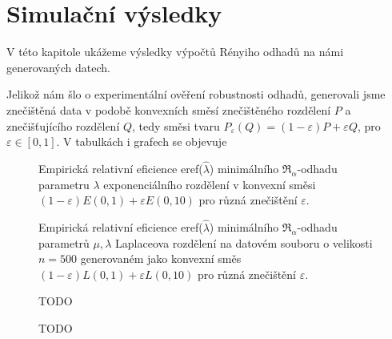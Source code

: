 \chapter{Simulační výsledky}

\noindent V této kapitole ukážeme výsledky výpočtů Rényiho odhadů na námi generovaných datech. 

Jelikož nám šlo o experimentální ověření robustnosti odhadů, generovali jsme znečištěná data v podobě konvexních směsí znečištěného rozdělení $P$ a znečišťujícího rozdělení $Q$, tedy směsi tvaru $P_\varepsilon(Q) = (1-\varepsilon)P + \varepsilon Q$, pro $\varepsilon \in [0,1]$. V tabulkách i grafech se objevuje 



\begin{figure}[htb]
	\begin{center}
		\caption{Empirická relativní eficience eref($\hat{\lambda}$) minimálního $\mathfrak{R}_\alpha$-odhadu parametru $\lambda$ exponenciálního rozdělení v konvexní směsi 
		$(1-\varepsilon)E(0,1) + \varepsilon E(0,10)$ pro různá znečištění $\varepsilon$.}
		\label{fig-eref-Exp-lambda}
	\end{center}
\end{figure}

\begin{figure}[htb]
	\begin{center}
		\caption{Empirická relativní eficience eref($\hat{\lambda}$) minimálního $\mathfrak{R}_\alpha$-odhadu parametrů  $\mu,\lambda$ Laplaceova rozdělení na datovém souboru o velikosti $n = 500$ generovaném	jako konvexní směs	$(1-\varepsilon)L(0,1) + \varepsilon L(0,10)$ pro různá znečištění $\varepsilon$.}
		\label{fig-eref-Laplace-lambda}
	\end{center}
\end{figure}

\begin{figure}[htb]
	\begin{center}
		\caption{ TODO }
		\label{fig-eref-Exp-mu}
	\end{center}
\end{figure}

\begin{figure}[htb]
	\begin{center}
		\caption{ TODO }
		\label{fig-eref-Laplace-mu}
	\end{center}
\end{figure}

